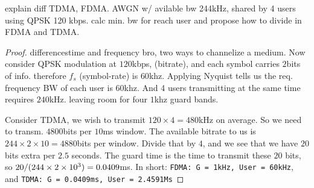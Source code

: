 \documentclass[./answersheet.tex]{subfiles}
\begin{document}
\begin{wts}
    explain diff TDMA, FDMA. AWGN w/ avilable bw 244kHz, shared by 4 users using QPSK \@ 120 kbps. calc min. bw for reach user and propose how to divide in FDMA and TDMA.
\end{wts}
\begin{proof}
    differencestime and frequency bro, two ways to channelize a medium. Now consider QPSK modulation at $120$kbps, (bitrate), and each symbol carries $2$bits of info. therefore $f_s$ (symbol-rate) is $60$khz. Applying Nyquist tells us the req. frequency BW of each user is $60$khz. And 4 users transmitting at the same time requires $240$kHz. leaving room for four $1$khz guard bands.

    Consider TDMA, we wish to transmit $120\times 4 = 480$kHz on average. So we need to transm. $4800$bits per $10$ms window. The available bitrate to us is $244\times2\times10=4880$bits per window. Divide that by $4$, and we see that we have $20$ bits extra per $2.5$ seconds. The guard time is the time to transmit these $20$ bits, so $20/(244\times 2\times 10^{3}) = 0.0409$ms.
    In short: \verb|FDMA: G = 1kHz, User = 60kHz|, and \verb|TDMA: G = 0.0409ms, User = 2.4591Ms|

\end{proof}
\end{document}
